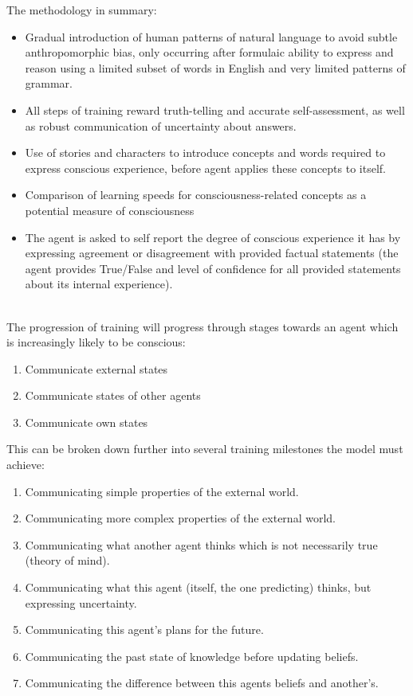 \documentclass{article}
\begin{document}
The methodology in summary:
\begin{itemize}
    \item Gradual introduction of human patterns of natural language to avoid subtle anthropomorphic bias, only occurring after formulaic ability to express and reason using a limited subset of words in English and very limited patterns of grammar.
    \item All steps of training reward truth-telling and accurate self-assessment, as well as robust communication of uncertainty about answers.
    \item Use of stories and characters to introduce concepts and words required to express conscious experience, before agent applies these concepts to itself.
    \item Comparison of learning speeds for consciousness-related concepts as a potential measure of consciousness
    \item The agent is asked to self report the degree of conscious experience it has by expressing agreement or disagreement with provided factual statements (the agent provides True/False and level of confidence for all provided statements about its internal experience).
\end{itemize}
\ \\
The progression of training will progress through stages towards an agent which is increasingly likely to be conscious: 
\begin{enumerate}
    \item Communicate external states 
    \item Communicate states of other agents
    \item Communicate own states 
\end{enumerate}
This can be broken down further into several training milestones the model must achieve:
\begin{enumerate}
    \item  Communicating simple properties of the external world. 
    \item  Communicating more complex properties of the external world.
    \item  Communicating what another agent thinks which is not necessarily true (theory of mind).
    \item  Communicating what this agent (itself, the one predicting) thinks, but expressing uncertainty.
    \item  Communicating this agent's plans for the future.
    \item  Communicating the past state of knowledge before updating beliefs.
    \item  Communicating the difference between this agents beliefs and another's.
\end{enumerate}
\end{document}
